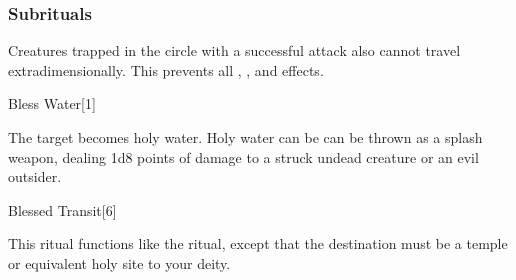\subsubsection{Subrituals}
Creatures trapped in the circle with a successful attack also cannot travel extradimensionally.
This prevents all , , and  effects.
\begin{spellsection}{Bless Water}[1]
\begin{spellcontent}
\begin{spelltargetinginfo}
\end{spelltargetinginfo}
\begin{spelleffects}
\spelleffect
The target becomes holy water.
Holy water can be can be thrown as a splash weapon, dealing 1d8 points of damage to a struck undead creature or an evil outsider.
\end{spelleffects}
\end{spellcontent}
\begin{spellfooter}
\end{spellfooter}
\begin{spellsubcontent}
\end{spellsubcontent}
\end{spellsection}
\begin{spellsection}{Blessed Transit}[6]
\begin{spellcontent}
\begin{spelltargetinginfo}
\end{spelltargetinginfo}
\begin{spelleffects}
\spelleffect
This ritual functions like the  ritual, except that the destination must be a temple or equivalent holy site to your deity.
\end{spelleffects}
\end{spellcontent}
\begin{spellfooter}
\end{spellfooter}
\begin{spellsubcontent}
\end{spellsubcontent}
\end{spellsection}
